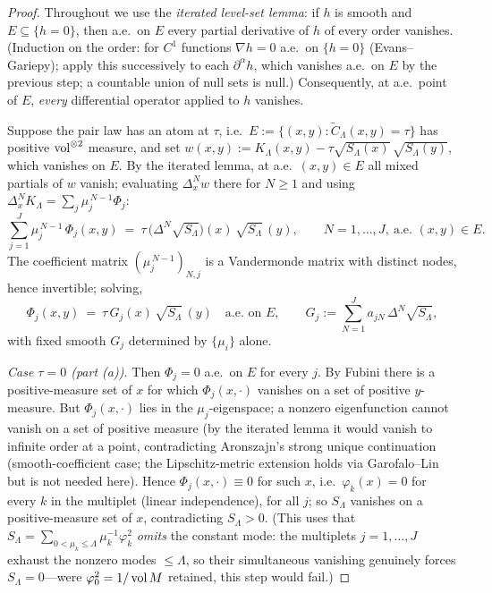 \begin{proof}
Throughout we use the \emph{iterated level-set lemma}: if $h$ is smooth and
$E\subseteq\{h=0\}$, then a.e.\ on $E$ every partial derivative of $h$ of every
order vanishes.  (Induction on the order: for $C^1$ functions $\nabla h=0$ a.e.\
on $\{h=0\}$ (Evans--Gariepy); apply this successively to each $\partial^\alpha
h$, which vanishes a.e.\ on $E$ by the previous step; a countable union of null
sets is null.)  Consequently, at a.e.\ point of $E$, \emph{every} differential
operator applied to $h$ vanishes.

Suppose the pair law has an atom at $\tau$, i.e.\
$E:=\{(x,y):\widetilde C_\Lambda(x,y)=\tau\}$ has positive $\operatorname{vol}^{\otimes2}$
measure, and set $w(x,y):=K_\Lambda(x,y)-\tau\sqrt{S_\Lambda(x)}\,
\sqrt{S_\Lambda(y)}$, which vanishes on $E$.  By the iterated lemma, at a.e.\
$(x,y)\in E$ all mixed partials of $w$ vanish; evaluating $\Delta_x^N w$ there
for $N\ge1$ and using $\Delta_x^N K_\Lambda=\sum_j\mu_j^{\,N-1}\Phi_j$:
\begin{equation}\label{eq:xside}
\sum_{j=1}^J\mu_j^{\,N-1}\,\Phi_j(x,y)\ =\ \tau\,\bigl(\Delta^N\sqrt{S_\Lambda}
\bigr)(x)\,\sqrt{S_\Lambda}\,(y),\qquad N=1,\dots,J,\ \text{a.e.\ }(x,y)\in E .
\end{equation}
The coefficient matrix $(\mu_j^{\,N-1})_{N,j}$ is a Vandermonde matrix with
distinct nodes, hence invertible; solving,
\begin{equation}\label{eq:phisolve}
\Phi_j(x,y)\ =\ \tau\,G_j(x)\,\sqrt{S_\Lambda}\,(y)\quad\text{a.e.\ on }E,
\qquad G_j:=\textstyle\sum_{N=1}^{J}a_{jN}\,\Delta^N\sqrt{S_\Lambda},
\end{equation}
with fixed smooth $G_j$ determined by $\{\mu_i\}$ alone.

\emph{Case $\tau=0$ (part (a)).}  Then $\Phi_j=0$ a.e.\ on $E$ for every $j$.
By Fubini there is a positive-measure set of $x$ for which $\Phi_j(x,\cdot)$
vanishes on a set of positive $y$-measure.  But $\Phi_j(x,\cdot)$ lies in the
$\mu_j$-eigenspace; a nonzero eigenfunction cannot vanish on a set of positive
measure (by the iterated lemma it would vanish to infinite order at a point,
contradicting Aronszajn's strong unique continuation (smooth-coefficient case;
the Lipschitz-metric extension holds via Garofalo--Lin but is not needed here).  Hence $\Phi_j(x,\cdot)\equiv0$ for such $x$, i.e.\
$\varphi_k(x)=0$ for every $k$ in the multiplet (linear independence), for all
$j$; so $S_\Lambda$ vanishes on a positive-measure set of $x$, contradicting
$S_\Lambda>0$. (This uses that $S_\Lambda=\sum_{0<\mu_k\le\Lambda}\mu_k^{-1}\varphi_k^2$
\emph{omits} the constant mode: the multiplets $j=1,\dots,J$ exhaust the nonzero
modes $\le\Lambda$, so their simultaneous vanishing genuinely forces
$S_\Lambda=0$---were $\varphi_0^2=1/\operatorname{vol} M$ retained, this step would fail.)


\end{proof}
